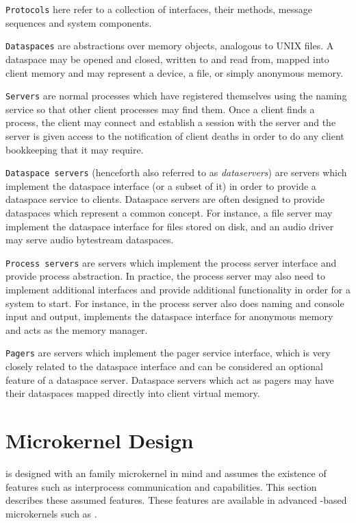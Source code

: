\texttt{Protocols} here refer to a collection of interfaces, their methods, message sequences and system components.

\texttt{Dataspaces} are abstractions over memory objects, analogous to UNIX files. A dataspace may be opened and closed, written to and read from, mapped into client memory and may represent a device, a file, or simply anonymous memory.

\texttt{Servers} are normal processes which have registered themselves using the naming service so that other client processes may find them. Once a client finds a process, the client may connect and establish a session with the server and the server is given access to the notification of client deaths in order to do any client bookkeeping that it may require.

\texttt{Dataspace servers} (henceforth also referred to as \emph{dataservers}) are servers which implement the dataspace interface (or a subset of it) in order to provide a dataspace service to clients. Dataspace servers are often designed to provide dataspaces which represent a common concept. For instance, a file server may implement the dataspace interface for files stored on disk, and an audio driver may serve audio bytestream dataspaces.

\texttt{Process servers} are servers which implement the process server interface and provide process abstraction. In practice, the process server may also need to implement additional interfaces and provide additional functionality in order for a system to start. For instance, in  the process server also does naming and console input and output, implements the dataspace interface for anonymous memory and acts as the memory manager.

\texttt{Pagers} are servers which implement the pager service interface, which is very closely related to the dataspace interface and can be considered an optional feature of a dataspace server. Dataspace servers which act as pagers may have their dataspaces mapped directly into client virtual memory.

\section{Microkernel Design}

 is designed with an \Lf family microkernel in mind and assumes the existence of features such as interprocess communication and capabilities. This section describes these assumed features. These features are available in advanced \Lf-based microkernels such as \seLf.

